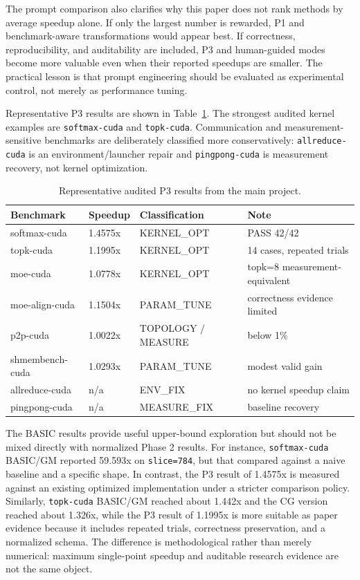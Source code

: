 \documentclass[conference]{IEEEtran}
\begin{document}
The prompt comparison also clarifies why this paper does not rank methods by average speedup alone. If only the largest number is rewarded, P1 and benchmark-aware transformations would appear best. If correctness, reproducibility, and auditability are included, P3 and human-guided modes become more valuable even when their reported speedups are smaller. The practical lesson is that prompt engineering should be evaluated as experimental control, not merely as performance tuning.

Representative P3 results are shown in Table~\ref{tab:p3}. The strongest audited kernel examples are \texttt{softmax-cuda} and \texttt{topk-cuda}. Communication and measurement-sensitive benchmarks are deliberately classified more conservatively: \texttt{allreduce-cuda} is an environment/launcher repair and \texttt{pingpong-cuda} is measurement recovery, not kernel optimization.

\begin{table}[t]
\centering
\caption{Representative audited P3 results from the main project.}
\label{tab:p3}
\footnotesize
\begin{tabular}{llll}
\hline
Benchmark & Speedup & Classification & Note \\
\hline
softmax-cuda & 1.4575x & KERNEL\_OPT & PASS 42/42 \\
topk-cuda & 1.1995x & KERNEL\_OPT & 14 cases, repeated trials \\
moe-cuda & 1.0778x & KERNEL\_OPT & topk=8 measurement-equivalent \\
moe-align-cuda & 1.1504x & PARAM\_TUNE & correctness evidence limited \\
p2p-cuda & 1.0022x & TOPOLOGY / MEASURE & below 1\% \\
shmembench-cuda & 1.0293x & PARAM\_TUNE & modest valid gain \\
allreduce-cuda & n/a & ENV\_FIX & no kernel speedup claim \\
pingpong-cuda & n/a & MEASURE\_FIX & baseline recovery \\
\hline
\end{tabular}
\end{table}

The BASIC results provide useful upper-bound exploration but should not be mixed directly with normalized Phase 2 results. For instance, \texttt{softmax-cuda} BASIC/GM reported 59.593x on \texttt{slice=784}, but that compared against a naive baseline and a specific shape. In contrast, the P3 result of 1.4575x is measured against an existing optimized implementation under a stricter comparison policy. Similarly, \texttt{topk-cuda} BASIC/GM reached about 1.442x and the CG version reached about 1.326x, while the P3 result of 1.1995x is more suitable as paper evidence because it includes repeated trials, correctness preservation, and a normalized schema. The difference is methodological rather than merely numerical: maximum single-point speedup and auditable research evidence are not the same object.
\end{document}
